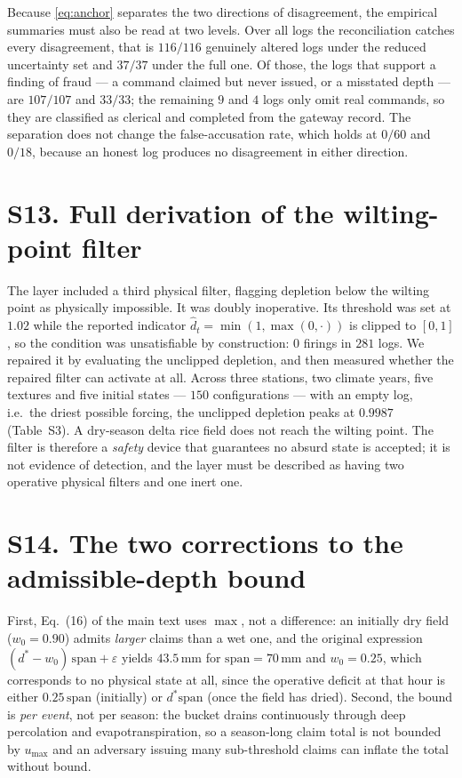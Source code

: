 Because \eqref{eq:anchor} separates the two directions of disagreement, the empirical
summaries must also be read at two levels. Over all logs the reconciliation catches every
disagreement, that is $116/116$ genuinely altered logs under the reduced uncertainty set and
$37/37$ under the full one. Of those, the logs that support a finding of fraud --- a command
claimed but never issued, or a misstated depth --- are $107/107$ and $33/33$; the remaining
$9$ and $4$ logs only omit real commands, so they are classified as clerical and completed
from the gateway record. The separation does not change the false-accusation rate, which
holds at $0/60$ and $0/18$, because an honest log produces no disagreement in either
direction.

\section*{S13. Full derivation of the wilting-point filter}

The layer included a third physical filter, flagging depletion below the wilting point as physically impossible. It was doubly inoperative. Its
threshold was set at $1.02$ while the reported indicator
$\hat d_t=\min(1,\max(0,\cdot))$ is clipped to $[0,1]$, so the condition was
unsatisfiable by construction: $0$ firings in $281$ logs. We repaired it by
evaluating the unclipped depletion, and then measured whether the repaired filter
can activate at all. Across three stations, two climate years, five textures and
five initial states --- $150$ configurations --- with an empty log, i.e.\ the
driest possible forcing, the unclipped depletion peaks at $0.9987$
(Table~S3). A dry-season delta rice field does not reach the
wilting point. The filter is therefore a \emph{safety} device that guarantees no
absurd state is accepted; it is not evidence of detection, and the layer must be
described as having two operative physical filters and one inert one.

\section*{S14. The two corrections to the admissible-depth bound}

First, Eq.~(16) of the main text uses $\max$, not a difference: an initially
dry field ($w_0=0.90$) admits \emph{larger} claims than a wet one, and the
original expression $(d^{*}-w_0)\,\mathrm{span}+\varepsilon$
yields $43.5$\,mm for $\mathrm{span}=70$\,mm and $w_0=0.25$, which
corresponds to no physical state at all, since the operative deficit at that
hour is either $0.25\,\mathrm{span}$ (initially) or $d^{*}\mathrm{span}$
(once the field has dried). Second, the bound is \emph{per event}, not per
season: the bucket drains continuously through deep percolation and
evapotranspiration, so a season-long claim total is not bounded by $u_{\max}$
and an adversary issuing many sub-threshold claims can inflate the total
without bound.

